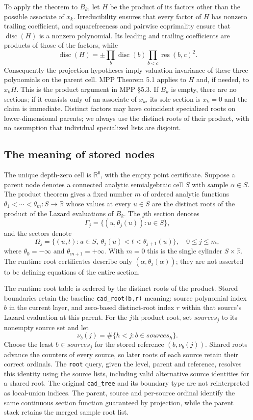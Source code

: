 \documentclass[11pt]{article}
\theoremstyle{definition}
\newcommand{\res}{\operatorname{res}}
\newcommand{\disc}{\operatorname{disc}}
\begin{document}
To apply the theorem to $B_k$, let $H$ be the product of its factors other than
the possible associate of $x_k$. Irreducibility ensures that every factor of $H$
has nonzero trailing coefficient, and squarefreeness and pairwise coprimality
ensure that $\disc(H)$ is a nonzero polynomial. Its leading and trailing
coefficients are products of those of the factors, while
\[
 \disc(H)=\pm\prod_b\disc(b)\prod_{b<c}\res(b,c)^2.
\]
Consequently the projection hypotheses imply valuation invariance of these
three polynomials on the parent cell. MPP Theorem 5.1 applies to $H$ and, if
needed, to $x_kH$. This is the product argument in MPP \S5.3. If $B_k$ is empty,
there are no sections; if it consists only of an associate of $x_k$, its sole
section is $x_k=0$ and the claim is immediate. Distinct factors may have coincident
specialized roots on lower-dimensional parents; we always use the distinct roots
of their product, with no assumption that individual specialized lists are disjoint.

\subsection{The meaning of stored nodes}
The unique depth-zero cell is $\mathbb R^0$, with the empty point certificate.
Suppose a parent node denotes a connected analytic semialgebraic cell $S$ with
sample $\alpha\in S$. The product theorem gives a fixed number $m$ of ordered
analytic functions $\theta_1<\cdots<\theta_m:S\to\mathbb R$ whose values at every
$u\in S$ are the distinct roots of the product of the Lazard evaluations of $B_k$.
The $j$th section denotes
\[
 \Gamma_j=\{(u,\theta_j(u)):u\in S\},
\]
and the sectors denote
\[
 \Omega_j=\{(u,t):u\in S,\ \theta_j(u)<t<\theta_{j+1}(u)\},
 \quad 0\le j\le m,
\]
where $\theta_0=-\infty$ and $\theta_{m+1}=+\infty$.
With $m=0$ this is the single cylinder $S\times\mathbb R$.
The runtime root certificates describe only $(\alpha,\theta_j(\alpha))$; they
are not asserted to be defining equations of the entire section.

The runtime root table is ordered by the distinct roots of the product.
Stored boundaries retain the baseline \texttt{cad\_root(b,r)} meaning: source
polynomial index $b$ in the current layer, and zero-based distinct-root index $r$
within that source's Lazard evaluation at this parent. For the $j$th product
root, set $sources_j$ to its nonempty source set and let
\[
 \nu_b(j)=\#\{h<j:b\in sources_h\}.
\]
Choose the least $b\in sources_j$ for the stored reference $(b,\nu_b(j))$.
Shared roots advance the counters of every source, so later roots of each
source retain their correct ordinals. The \texttt{root} query, given the level, parent and reference, resolves this identity using the source
lists, including valid alternative source identities for a shared root.
The original \texttt{cad\_tree} and its boundary type are not reinterpreted as
local-union indices. The parent, source and per-source ordinal identify the
same continuous section function guaranteed by projection, while the parent
stack retains the merged sample root list.
\end{document}
